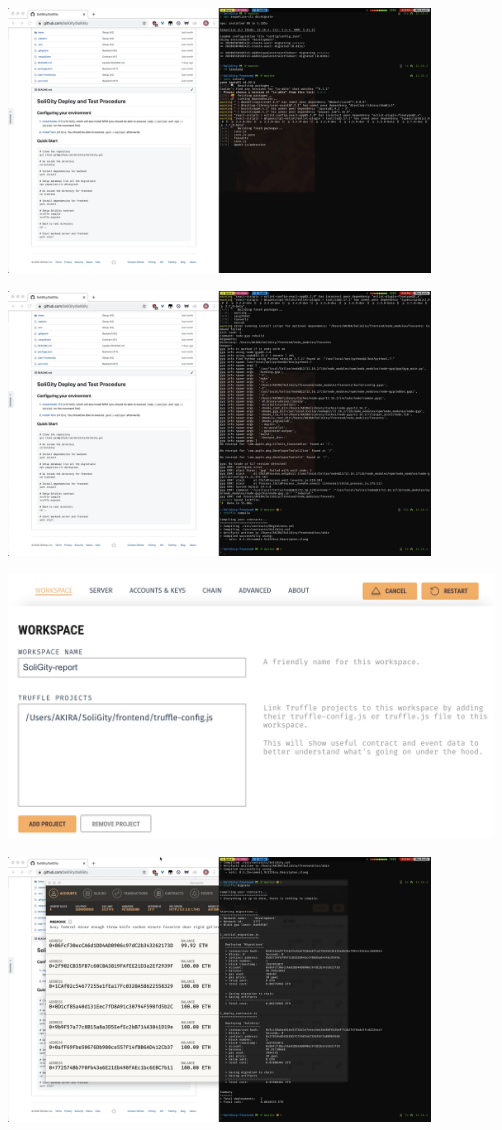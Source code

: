 \documentclass[12pt]{article}
\renewcommand{\_}{\kern-1.5pt\textunderscore\kern-1.5pt}
\begin{document}
\includegraphics[height=7cm]{graphs/04. yarn_install_frontend}

\includegraphics[height=7cm]{graphs/05. truffle_compile}

\includegraphics[height=7cm]{graphs/06. ganache_setup}

\includegraphics[height=7cm]{graphs/07. truffle_migrate}
\end{document}
